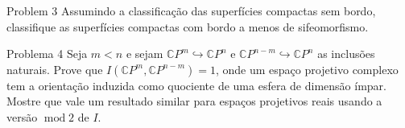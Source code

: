 \begin{thing1}{Problem 3}\label{prob:3}\leavevmode
Assumindo a classificação das superfícies compactas sem bordo, classifique as superfícies compactas com bordo a menos de sifeomorfismo.
\end{thing1}

\begin{thing1}{Problema 4}\label{prob:a 4}\leavevmode
Seja \(m<n\) e sejam \(\mathbb{C}P^{m}\hookrightarrow \mathbb{C}P^{n}\) e \(\mathbb{C}P^{n-m}\hookrightarrow \mathbb{C}P^{n}\) as inclusões naturais. Prove que \(I(\mathbb{C}P^{m},\mathbb{C}P^{n-m})=1\), onde um espaço projetivo complexo tem a orientação induzida como quociente de uma esfera de dimensão ímpar. Mostre que vale um resultado similar para espaços projetivos reais usando a versão \(\operatorname{mod}2\) de \(I\).
\end{thing1}

